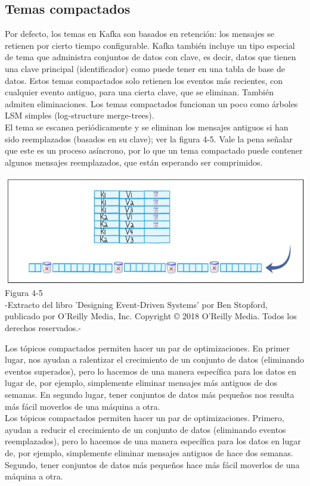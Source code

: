 \documentclass{article}
\begin{document}
\subsection{Temas compactados}
Por defecto, los temas en Kafka son basados en retención: los mensajes se retienen por cierto
tiempo configurable. Kafka también incluye un tipo especial de tema que
administra conjuntos de datos con clave, es decir, datos que tienen una clave principal (identificador) como puede tener en una tabla de base de datos. Estos temas compactados solo retienen los eventos más recientes, con cualquier evento antiguo, para una cierta clave, que se eliminan. También admiten eliminaciones.
Los temas compactados funcionan un poco como árboles LSM simples (log-structure merge-trees).\\

El tema se escanea periódicamente y se eliminan los mensajes antiguos si han sido reemplazados (basados en su clave); ver la figura 4-5. Vale la pena señalar que este es
un proceso asíncrono, por lo que un tema compactado puede contener algunos mensajes reemplazados, que están esperando ser comprimidos.
\begin{center}
    \includegraphics[scale=0.8]{figure4.5.png}
    Figura 4-5\\
    -Extracto del libro 'Designing Event-Driven Systems' por Ben Stopford, publicado por O'Reilly Media, Inc. Copyright © 2018 O'Reilly Media. Todos los derechos reservados.-
\end{center}

Los tópicos compactados permiten hacer un par de optimizaciones. En primer lugar, nos ayudan a ralentizar el crecimiento de un conjunto de datos (eliminando eventos superados), pero lo hacemos de una manera específica para los datos en lugar de, por ejemplo, simplemente eliminar mensajes más antiguos de dos semanas. En segundo lugar, tener conjuntos de datos más pequeños nos resulta más fácil moverlos de una máquina a otra.\\

Los tópicos compactados permiten hacer un par de optimizaciones. Primero, ayudan a reducir el crecimiento de un conjunto de datos (eliminando eventos reemplazados), pero lo hacemos de una manera específica para los datos en lugar de, por ejemplo, simplemente eliminar mensajes antiguos de hace dos semanas. Segundo, tener conjuntos de datos más pequeños hace más fácil moverlos de una máquina a otra.\\
\end{document}
